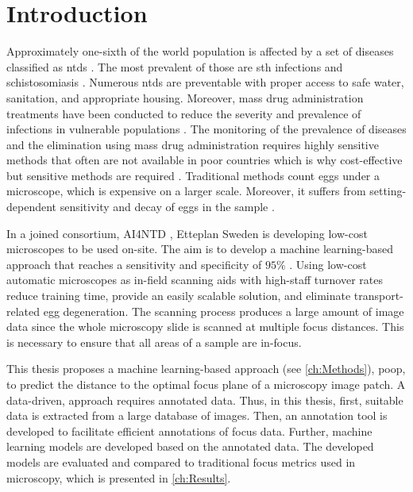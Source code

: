 \chapter{Introduction}
\label{ch:Introduction}

Approximately one-sixth of the world population is affected by a set of diseases classified as \acfp{ntd} \cite{feasey2010neglected}. The most prevalent of those are \acf{sth} infections and schistosomiasis \cite{barenbold2017estimating}. Numerous \acp{ntd} are preventable with proper access to safe water, sanitation, and appropriate housing. Moreover, mass drug administration treatments have been conducted to reduce the severity and prevalence of infections in vulnerable populations \cite{jourdan2018soiltransmitted}. The monitoring of the prevalence of diseases and the elimination using mass drug administration requires highly sensitive methods that often are not available in poor countries which is why cost-effective but sensitive methods are required \cite{mbongngwese2020diagnostic}.
Traditional methods count eggs under a microscope, which is expensive on a larger scale. Moreover, it suffers from setting-dependent sensitivity and decay of eggs in the sample \cite{barenbold2017estimating}. 

In a joined consortium, AI4NTD \cite{ai4ntd2021developing}, Etteplan Sweden \cite{etteplanoyjengineering} is developing low-cost microscopes to be used on-site. The aim is to develop a machine learning-based approach that reaches a sensitivity and specificity of $95 \%$ 
\cite{etteplan2021fighting}. Using low-cost automatic microscopes as in-field scanning aids with high-staff turnover rates reduce training time, provide an easily scalable solution, and eliminate transport-related egg degeneration.
The scanning process produces a large amount of image data since the whole microscopy slide is scanned at multiple focus distances. This is necessary to ensure that all areas of a sample are in-focus.

This thesis proposes a machine learning-based approach (see \autoref{ch:Methods}), \ac{poop}, to predict the distance to the optimal focus plane of a microscopy image patch. A data-driven, approach requires annotated data. Thus, in this thesis, first, suitable data is extracted from a large database of images. Then, an annotation tool is developed to facilitate efficient annotations of focus data. Further, machine learning models are developed based on the annotated data. The developed models are evaluated and compared to traditional focus metrics used in microscopy, which is presented in \autoref{ch:Results}.

